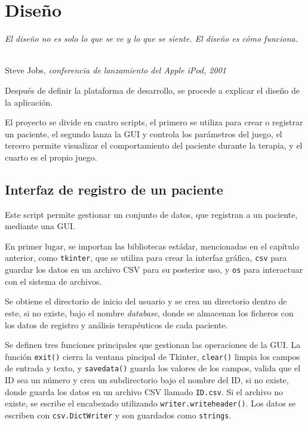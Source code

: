 \chapter{Diseño}
\label{cap:capitulo4}

\begin{flushright}
\begin{minipage}[]{9cm}
\emph{El diseño no es solo lo que se ve y lo que se siente. El diseño es cómo funciona.}\\
\end{minipage}\\

Steve Jobs, \textit{conferencia de lanzamiento del Apple iPod, 2001}\\
\end{flushright}

\vspace{1cm}

Después de definir la plataforma de desarrollo, se procede a explicar el diseño de la aplicación.

El proyecto se divide en cuatro scripts, el primero se utiliza para crear o registrar un paciente, el segundo lanza la GUI y controla los parámetros del juego, el tercero permite visualizar el comportamiento del paciente durante la terapia, y el cuarto es el propio juego.

\section{Interfaz de registro de un paciente}
\label{section:registro}

Este script permite gestionar un conjunto de datos, que registran a un paciente, mediante una GUI.

En primer lugar, se importan las bibliotecas estádar, mencionadas en el capítulo anterior, como \verb|tkinter|, que se utiliza para crear la interfaz gráfica, \verb|csv| para guardar los datos en un archivo CSV para su posterior uso, y \verb|os| para interactuar con el sistema de archivos.

Se obtiene el directorio de inicio del usuario y se crea un directorio dentro de este, si no existe, bajo el nombre \textit{database}, donde se almacenan los ficheros con los datos de registro y análisis terapéuticos de cada paciente.

Se definen tres funciones principales que gestionan las operaciones de la GUI.
La función \verb|exit()| cierra la ventana pincipal de Tkinter, \verb|clear()| limpia los campos de entrada y texto, y \verb|savedata()| guarda los valores de los campos, valida que el ID sea un número y crea un subdirectorio bajo el nombre del ID, si no existe, donde guarda los datos en un archivo CSV llamado \verb|ID.csv|.
Si el archivo no existe, se escribe el encabezado utilizando \verb|writer.writeheader()|.
Los datos se escriben con \verb|csv.DictWriter| y son guardados como \verb|strings|.

